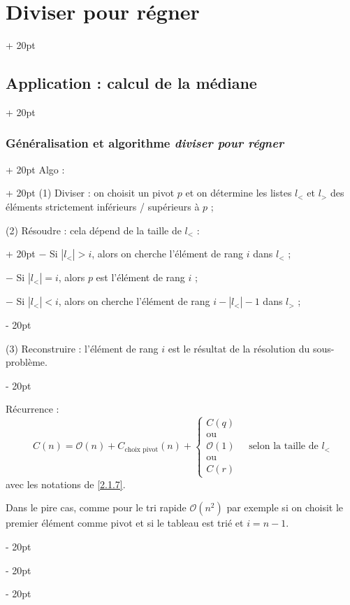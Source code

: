 \documentclass[a4paper, 12pt, twoside]{article}
\newcommand{\abs}[1]{\left\lvert #1 \right\rvert} %
\newcommand{\ind}[1][20pt]{\advance\leftskip + #1}
\newcommand{\deind}[1][20pt]{\advance\leftskip - #1}
\newenvironment{indt}[2][20pt]{#2 \par \ind[#1]}{\par \deind} %
\begin{document}
\begin{indt}{\section{Diviser pour régner}}
\begin{indt}{\subsection{Application : calcul de la médiane}}
\begin{indt}{\subsubsection{Généralisation et algorithme \textit{diviser pour régner}}}
                \begin{indt}{Algo :}
                    (1) Diviser : on choisit un pivot $p$ et on détermine les listes $l_<$ et $l_>$ des éléments strictement inférieurs / supérieurs à $p$ ;
                    
                    \begin{indt}{(2) Résoudre : cela dépend de la taille de $l_<$ :}
                        $-$ Si $\abs{l_<} > i$, alors on cherche l'élément de rang $i$ dans $l_<$ ;
                        
                        $-$ Si $\abs{l_<} = i$, alors $p$ est l'élément de rang $i$ ;
                        
                        $-$ Si $\abs{l_<} < i$, alors on cherche l'élément de rang $i - \abs{l_<} - 1$ dans $l_>$ ;
                    \end{indt}
                    
                    (3) Reconstruire : l'élément de rang $i$ est le résultat de la résolution du sous-problème.
                \end{indt}
                
                \vspace{6pt}
                
                Récurrence :
                    \[
                        C(n) =
                        \mathcal O(n)
                        + C_{\text{choix pivot}}(n)
                        +
                        \begin{cases}
                            C(q)
                            \\
                            \text{ou}
                            \\
                            \mathcal O(1)
                            \\
                            \text{ou}
                            \\
                            C(r)
                        \end{cases}
                        \quad \text{selon la taille de $l_<$}
                    \]
                avec les notations de \ref{2.1.7}.
                
                \vspace{12pt}
                
                Dans le pire cas, comme pour le tri rapide $\mathcal O(n^2)$ par exemple si on choisit le premier élément comme pivot et si le tableau est trié et $i = n - 1$.
                

\end{indt}
\end{indt}
\end{indt}
\end{document}
